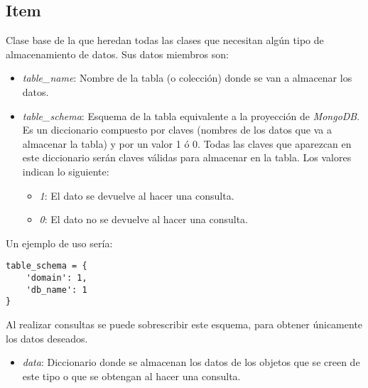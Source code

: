 \subsection{Item}

Clase base de la que heredan todas las clases que necesitan algún tipo de almacenamiento de datos. Sus datos miembros son:
\begin{itemize}
	\item \textit{table\_name}: Nombre de la tabla (o colección) donde se van a almacenar los datos.
	\item \textit{table\_schema}: Esquema de la tabla equivalente a la proyección de \textit{MongoDB}. Es un diccionario compuesto por claves (nombres de los datos que va a almacenar la tabla) y por un valor 1 ó 0. Todas las claves que aparezcan en este diccionario serán claves válidas para almacenar en la tabla. Los valores indican lo siguiente:
	\begin{itemize}
		\item \textit{1}: El dato se devuelve al hacer una consulta.
		\item \textit{0}: El dato no se devuelve al hacer una consulta.
	\end{itemize}
\end{itemize}

\bigskip
Un ejemplo de uso sería:

\begin{lstlisting}
table_schema = {
	'domain': 1,
	'db_name': 1
}
\end{lstlisting}

\bigskip
Al realizar consultas se puede sobrescribir este esquema, para obtener únicamente los datos deseados.
\begin{itemize}
	\item \textit{data}: Diccionario donde se almacenan los datos de los objetos que se creen de este tipo o que se obtengan al hacer una consulta.
\end{itemize}


